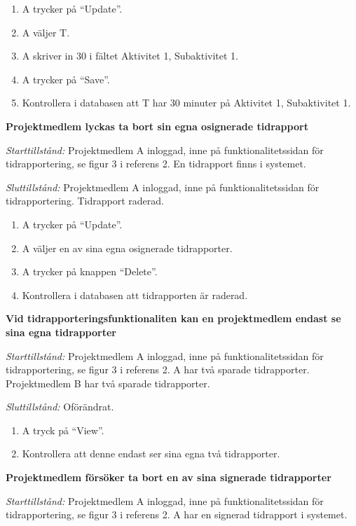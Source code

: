 \documentclass[a4paper]{article}
\begin{document}
\begin{FT}
\begin{enumerate}
\item A trycker på ``Update''.
\item A väljer T.
\item A skriver in 30 i fältet Aktivitet 1, Subaktivitet 1.
\item A trycker på ``Save''.
\item Kontrollera i databasen att T har 30 minuter på Aktivitet 1, Subaktivitet 1.
\end{enumerate}


\item\textbf{Projektmedlem lyckas ta bort sin egna osignerade tidrapport}

\emph{Starttillstånd:} Projektmedlem A inloggad, inne på funktionalitetssidan för tidrapportering, se figur 3 i referens 2. En tidrapport finns i systemet.

\emph{Sluttillstånd:} Projektmedlem A inloggad, inne på funktionalitetssidan för tidrapportering. Tidrapport raderad.

\begin{enumerate}
\item A trycker på ``Update''.
\item A väljer en av sina egna osignerade tidrapporter.
\item A trycker på knappen ``Delete''.
\item Kontrollera i databasen att tidrapporten är raderad.
\end{enumerate}


\item
\textbf{Vid tidrapporteringsfunktionaliten kan en projektmedlem endast se sina egna tidrapporter} 

\emph{Starttillstånd:} Projektmedlem A inloggad, inne på funktionalitetssidan för tidrapportering, se figur 3 i referens 2. A har två sparade tidrapporter. Projektmedlem B har två sparade tidrapporter.

\emph{Sluttillstånd:} Oförändrat.

\begin{enumerate}
\item A tryck på ``View''.
\item Kontrollera att denne endast ser sina egna två tidrapporter.
\end{enumerate}


\item
\textbf{Projektmedlem försöker ta bort en av sina signerade tidrapporter}

\emph{Starttillstånd:} Projektmedlem A inloggad, inne på funktionalitetssidan för tidrapportering, se figur 3 i referens 2. A har en signerad tidrapport i systemet.


\end{FT}
\end{document}
